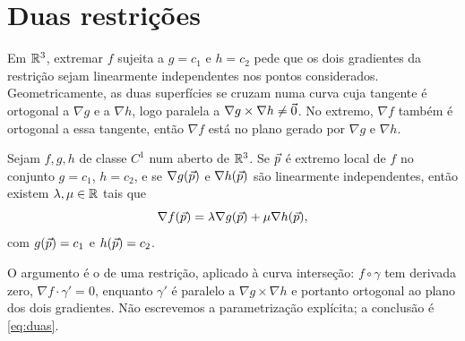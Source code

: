 \documentclass[11pt,a4paper]{article}
\begin{document}
\section{Duas restrições}

Em $\mathbb{R}^3$, extremar $f$ sujeita a $g=c_1$ e $h=c_2$ pede que os dois gradientes da restrição sejam linearmente independentes nos pontos considerados. Geometricamente, as duas superfícies se cruzam numa curva cuja tangente é ortogonal a $\nabla g$ e a $\nabla h$, logo paralela a $\nabla g\times\nabla h\neq\vec{0}$. No extremo, $\nabla f$ também é ortogonal a essa tangente, então $\nabla f$ está no plano gerado por $\nabla g$ e $\nabla h$.

\begin{teorema}
Sejam $f,g,h$ de classe $C^1$ num aberto de $\mathbb{R}^3$. Se $\vec{p}$ é extremo local de $f$ no conjunto $g=c_1$, $h=c_2$, e se $\nabla g(\vec{p})$ e $\nabla h(\vec{p})$ são linearmente independentes, então existem $\lambda,\mu\in\mathbb{R}$ tais que
\begin{equation}
\nabla f(\vec{p})=\lambda\nabla g(\vec{p})+\mu\nabla h(\vec{p}),
\label{eq:duas}
\end{equation}
com $g(\vec{p})=c_1$ e $h(\vec{p})=c_2$.
\end{teorema}

O argumento é o de uma restrição, aplicado à curva interseção: $f\circ\gamma$ tem derivada zero, $\nabla f\cdot\gamma'=0$, enquanto $\gamma'$ é paralelo a $\nabla g\times\nabla h$ e portanto ortogonal ao plano dos dois gradientes. Não escrevemos a parametrização explícita; a conclusão é \eqref{eq:duas}.
\end{document}
